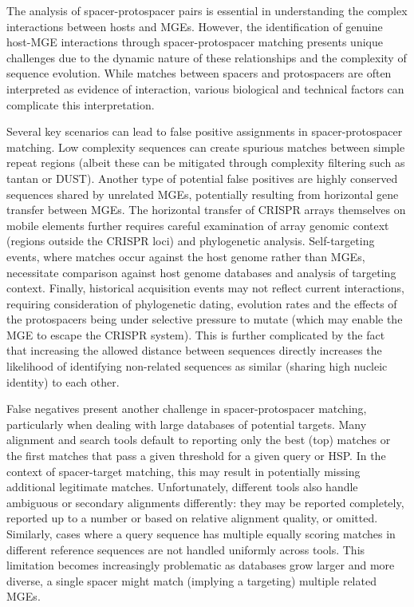 \documentclass[
]{article}
\begin{document}
The analysis of spacer-protospacer pairs is essential in understanding
the complex interactions between hosts and
MGEs\autocite{Edwards2015_phage_host}. However, the identification of
genuine host-MGE interactions through spacer-protospacer matching
presents unique challenges due to the dynamic nature of these
relationships and the complexity of sequence evolution. While matches
between spacers and protospacers are often interpreted as evidence of
interaction, various biological and technical factors can complicate
this
interpretation\autocite{Edwards2015_phage_host,soto_perez_crispr_2019}.

Several key scenarios can lead to false positive assignments in
spacer-protospacer matching. Low complexity sequences can create
spurious matches between simple repeat regions (albeit these can be
mitigated through complexity filtering such as
tantan\autocite{Frith_2010} or DUST\autocite{Morgulis_2006}). Another
type of potential false positives are highly conserved sequences shared
by unrelated MGEs, potentially resulting from horizontal gene transfer
between MGEs. The horizontal transfer of CRISPR arrays themselves on
mobile elements further requires careful examination of array genomic
context (regions outside the CRISPR loci) and phylogenetic analysis.
Self-targeting events, where matches occur against the host genome
rather than MGEs, necessitate comparison against host genome databases
and analysis of targeting context\autocite{Stern_2010}. Finally,
historical acquisition events may not reflect current interactions,
requiring consideration of phylogenetic dating, evolution rates and the
effects of the protospacers being under selective pressure to mutate
(which may enable the MGE to escape the CRISPR system). This is further
complicated by the fact that increasing the allowed distance between
sequences directly increases the likelihood of identifying non-related
sequences as similar (sharing high nucleic identity) to each other.

False negatives present another challenge in spacer-protospacer
matching, particularly when dealing with large databases of potential
targets. Many alignment and search tools default to reporting only the
best (top) matches or the first matches that pass a given threshold for
a given query or HSP. In the context of spacer-target matching, this may
result in potentially missing additional legitimate matches.
Unfortunately, different tools also handle ambiguous or secondary
alignments differently: they may be reported completely, reported up to
a number or based on relative alignment quality, or omitted. Similarly,
cases where a query sequence has multiple equally scoring matches in
different reference sequences are not handled uniformly across tools.
This limitation becomes increasingly problematic as databases grow
larger and more diverse, a single spacer might match (implying a
targeting) multiple related MGEs.
\end{document}
